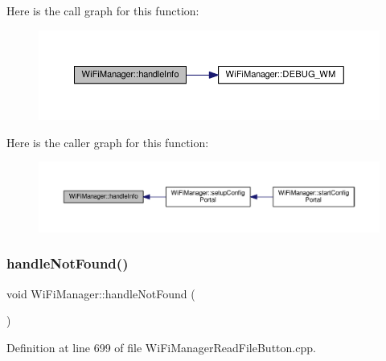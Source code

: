 Here is the call graph for this function\+:\nopagebreak
\begin{figure}[H]
\begin{center}
\leavevmode
\includegraphics[width=350pt]{d4/dc8/class_wi_fi_manager_ac35e46661f8a209d84bba62d9aa43a35_cgraph}
\end{center}
\end{figure}
Here is the caller graph for this function\+:\nopagebreak
\begin{figure}[H]
\begin{center}
\leavevmode
\includegraphics[width=350pt]{d4/dc8/class_wi_fi_manager_ac35e46661f8a209d84bba62d9aa43a35_icgraph}
\end{center}
\end{figure}
\mbox{\label{class_wi_fi_manager_a7d01f7de3e4b76acdabffac79fa3d0ab}} 
\subsubsection{\texorpdfstring{handle\+Not\+Found()}{handleNotFound()}}
{\footnotesize\ttfamily void Wi\+Fi\+Manager\+::handle\+Not\+Found (\begin{DoxyParamCaption}{ }\end{DoxyParamCaption})\hspace{0.3cm}{\ttfamily [private]}}



Definition at line 699 of file Wi\+Fi\+Manager\+Read\+File\+Button.\+cpp.


